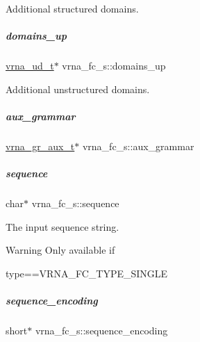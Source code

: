 Additional structured domains. 

\mbox{\label{group__fold__compound_a4f70b6d32681fc8ca061236f21819ae7}} 
\subparagraph{\texorpdfstring{domains\+\_\+up}{domains\_up}}
{\footnotesize\ttfamily \mbox{\hyperlink{group__domains__up_ga0009117b14d29143e8b18ab891f48c2d}{vrna\+\_\+ud\+\_\+t}}$\ast$ vrna\+\_\+fc\+\_\+s\+::domains\+\_\+up}



Additional unstructured domains. 

\mbox{\label{group__fold__compound_a42f34f531718cead0550a1ed59785e6d}} 
\subparagraph{\texorpdfstring{aux\+\_\+grammar}{aux\_grammar}}
{\footnotesize\ttfamily \mbox{\hyperlink{group__grammar_ga8825fbe6d7de2ff61c232cc7550a82cc}{vrna\+\_\+gr\+\_\+aux\+\_\+t}}$\ast$ vrna\+\_\+fc\+\_\+s\+::aux\+\_\+grammar}

\mbox{\label{group__fold__compound_a87f6abcda89cfb7a486c97e1f5371525}} 
\subparagraph{\texorpdfstring{sequence}{sequence}}
{\footnotesize\ttfamily char$\ast$ vrna\+\_\+fc\+\_\+s\+::sequence}



The input sequence string. 

\begin{DoxyWarning}{Warning}
Only available if\begin{DoxyVerb}type==VRNA_FC_TYPE_SINGLE \end{DoxyVerb}
 
\end{DoxyWarning}
\mbox{\label{group__fold__compound_a9934bdb695d35a3544285cbcc19f9763}} 
\subparagraph{\texorpdfstring{sequence\+\_\+encoding}{sequence\_encoding}}
{\footnotesize\ttfamily short$\ast$ vrna\+\_\+fc\+\_\+s\+::sequence\+\_\+encoding}



